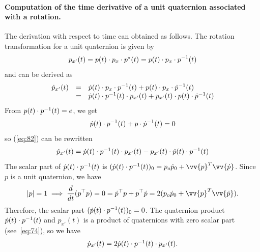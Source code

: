 \paragraph{Computation of the time derivative of a unit  quaternion associated with a rotation.}
The derivation with respect to time can obtained as follows. The rotation transformation for a unit quaternion is given by
\begin{equation}
  \label{eq:82}
  p_{x'}(t) = p(t) \cdot p_x \cdot p^\star(t) =  p(t) \cdot p_x \cdot p^{-1}(t)
\end{equation}
and can be derived as
\begin{equation}
  \label{eq:83}
  \begin{array}{lcl}
    \dot p_{x'}(t) &=& \dot p(t) \cdot p_x \cdot p^{-1}(t) + p(t) \cdot p_x \cdot \dot p^{-1}(t) \\
                  &=& \dot p(t) \cdot p^{-1}(t)  \cdot   p_{x'}(t)  +      p_{x'}(t) \cdot p(t)  \cdot \dot p^{-1}(t)
  \end{array}
\end{equation}
From $p(t) \cdot p^{-1}(t) =e$, we get
\begin{equation}
  \label{eq:84}
  \dot p(t) \cdot p^{-1}(t) + p \cdot \dot p^{-1}(t) = 0
\end{equation}
so (\ref{eq:82}) can be rewritten
\begin{equation}
  \label{eq:85}
  \begin{array}{lcl}
    \dot p_{x'}(t) = \dot p(t) \cdot p^{-1}(t)   \cdot   p_{x'}(t)  -    p_{x'}(t) \cdot  \dot p(t) \cdot p^{-1}(t)
  \end{array}
\end{equation}
The scalar part of $\dot p(t) \cdot p^{-1}(t)$ is $(\dot p(t) \glaw p^{-1}(t))_0 = p_o \dot p_0 + \vv{p}^T\vv{\dot p}$. Since $p$ is a unit quaternion, we have
\begin{equation}
  \label{eq:86}
  |p|=1 \implies \frac{d}{dt} (p^\top p) = 0 =  \dot p^\top p + p^\top \dot p =   2( p_o \dot p_0 + \vv{p}^T\vv{\dot p}).
\end{equation}
Therefore, the scalar part $(\dot p(t) \cdot p^{-1}(t))_0 =0$.
The quaternion product $\dot p(t) \cdot p^{-1}(t)$ and  $p_{x'}(t)$ is a product of quaternions with zero scalar part (see~\eqref{eq:74}), so we have
\begin{equation}
  \label{eq:87}
  \begin{array}{lcl}
    \dot p_{x'}(t) = 2 \dot p(t) \cdot p^{-1}(t)   \cdot p_{x'}(t).
  \end{array}
\end{equation}
